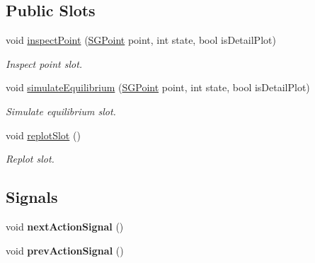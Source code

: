 \subsection*{Public Slots}
\begin{DoxyCompactItemize}
\item 
\mbox{\label{classSGSolutionHandler_ac1138f5e4b98e30bb55b7e524767a0cb}} 
void \hyperlink{classSGSolutionHandler_ac1138f5e4b98e30bb55b7e524767a0cb}{inspect\+Point} (\hyperlink{classSGPoint}{S\+G\+Point} point, int state, bool is\+Detail\+Plot)
\begin{DoxyCompactList}\small\item\em Inspect point slot. \end{DoxyCompactList}\item 
\mbox{\label{classSGSolutionHandler_ae4edd65c1f83ef7a63ab53c454bfd9be}} 
void \hyperlink{classSGSolutionHandler_ae4edd65c1f83ef7a63ab53c454bfd9be}{simulate\+Equilibrium} (\hyperlink{classSGPoint}{S\+G\+Point} point, int state, bool is\+Detail\+Plot)
\begin{DoxyCompactList}\small\item\em Simulate equilibrium slot. \end{DoxyCompactList}\item 
\mbox{\label{classSGSolutionHandler_a0ba9f2ac4408be0d36638f3d49a3b05c}} 
void \hyperlink{classSGSolutionHandler_a0ba9f2ac4408be0d36638f3d49a3b05c}{replot\+Slot} ()
\begin{DoxyCompactList}\small\item\em Replot slot. \end{DoxyCompactList}\end{DoxyCompactItemize}
\subsection*{Signals}
\begin{DoxyCompactItemize}
\item 
\mbox{\label{classSGSolutionHandler_a2c66e5c3343a056cda2efaa85aebddf9}} 
void {\bfseries next\+Action\+Signal} ()
\item 
\mbox{\label{classSGSolutionHandler_a7d652517a4d43d5fe09e1c5dfe96ffdb}} 
void {\bfseries prev\+Action\+Signal} ()
\end{DoxyCompactItemize}
